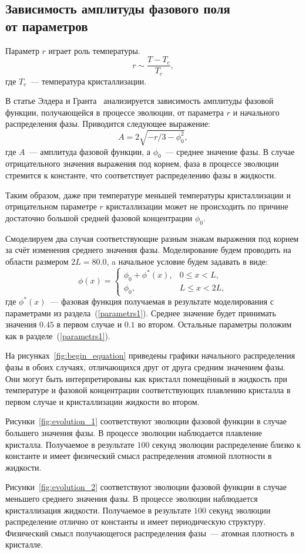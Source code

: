\subsection{Зависимость амплитуды фазового поля\\от параметров}
Параметр $r$ играет роль температуры. 
\begin{equation*}
    r \sim \frac{T - T_c}{T_c},
\end{equation*}
где $T_c$~--- температура кристаллизации.

В статье Элдера и Гранта~\cite{elder_2004} анализируется зависимость амплитуды фазовой функции, получающейся в процессе эволюции, от параметра $r$ и начального распределения фазы. Приводится следующее выражение:
\begin{equation*}
    A = 2 \sqrt{- r / 3 - \phi_0^2},
\end{equation*}
где $A$~--- амплитуда фазовой функции, а $\phi_0$~--- среднее значение фазы.
В случае отрицательного значения выражения под корнем, фаза в процессе эволюции стремится к константе, что соответствует распределению фазы в жидкости.

Таким образом, даже при температуре меньшей температуры кристаллизации и отрицательном параметре $r$ кристаллизации может не происходить по причине достаточно большой средней фазовой концентрации $\phi_0$.

Смоделируем два случая соответствующие разным знакам выражения под корнем за счёт изменения среднего значения фазы. Моделирование будем проводить на области размером $2 L = 80.0$, a начальное условие будем задавать в виде:
\[
\phi(x) = 
\left\{
\begin{array}{ll}
    \phi_0 + \phi^*(x), & 0 \leqslant x < L,\\
    \phi_0, & L \leqslant x < 2 L,
\end{array}
\right.
\]
где $\phi^*(x)$~--- фазовая функция получаемая в результате моделирования с параметрами из раздела~(\ref{parametrs1}). Среднее значение будет принимать значения $0.45$ в первом случае и $0.1$ во втором. Остальные параметры положим как в разделе~(\ref{parametrs1}).

На рисунках~\ref{fig:begin_equation} приведены графики начального распределения фазы в обоих случаях, отличающихся друг от друга средним значением фазы. Они могут быть интерпретированы как кристалл помещённый в жидкость при температуре и фазовой концентрации соответствующих плавлению кристалла в первом случае и кристаллизации жидкости во втором.

Рисунки~\ref{fig:evolution_1} соответствуют эволюции фазовой функции в случае большего значения фазы. В процессе эволюции наблюдается плавление кристалла. Получаемое в результате $100$ секунд эволюции распределение близко к константе и имеет физический смысл распределения атомной плотности в жидкости.

Рисунки~\ref{fig:evolution_2} соответствуют эволюции фазовой функции в случае меньшего среднего значения фазы. В процессе эволюции наблюдается кристаллизация жидкости. Получаемое в результате $100$ секунд эволюции распределение отлично от константы и имеет периодическую структуру. Физический смысл получающегося распределения фазы~--- атомная плотность в кристалле.

